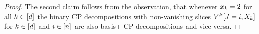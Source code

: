 \begin{proof}
	The second claim follows from the observation, that whenever $x_{k}=2$ for all $k\in[d]$ the binary CP decompositions with non-vanishing slices $V^{k}[J=i, X_{k}]$ for $k\in[d]$ and $i\in[n]$ are also basis+ CP decompositions and vice versa.
%
%	
%

\end{proof}
